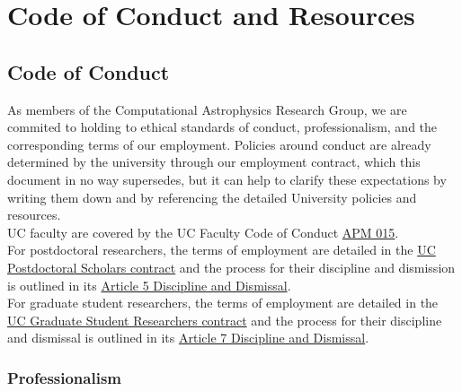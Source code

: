 \section{Code of Conduct and Resources}
\label{sec:code_of_conduct}

\subsection{Code of Conduct}

As members of the Computational Astrophysics Research Group, we are commited to 
holding to ethical standards of conduct, professionalism,
and the corresponding terms of our employment. Policies around conduct are already
determined by the university through our employment contract, which this
document in no way supersedes, but it can help to clarify these
expectations by writing them down and by referencing the detailed University
policies and resources.\\

\noindent
UC faculty are covered by the UC Faculty Code of Conduct \href{https://ucop.edu/academic-personnel-programs/_files/apm/apm-015.pdf}{APM 015}.\\

\noindent
For postdoctoral researchers, the terms of employment are detailed in the
\href{https://ucnet.universityofcalifornia.edu/resources/employment-policies-contracts/bargaining-units/postdoctoral-scholars/contract/}{UC Postdoctoral Scholars contract} and the process
for their discipline and dismission is outlined in its 
\href{https://ucnet.universityofcalifornia.edu/wp-content/uploads/labor/bargaining-units/px/docs/px_tentative_agremeents_effective_12-09-2022.pdf}{Article 5 Discipline and Dismissal}.\\

\noindent
For graduate student researchers, the terms of employment are detailed in the \href{https://ucnet.universityofcalifornia.edu/resources/employment-policies-contracts/bargaining-units/graduate-student-researchers/contract/}{UC Graduate Student Researchers contract} and the
process for their discipline and dismissal is outlined in its \href{https://qa.ucnet.universityofcalifornia.edu/labor/bargaining-units/br/docs/br_07_discipline-and-dismissal_20225-2025.pdf}{Article 7 Discipline and Dismissal}.\\



\subsubsection{Professionalism}

